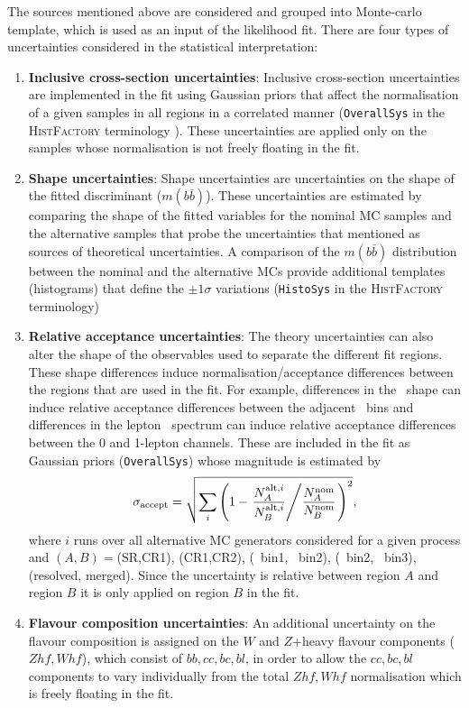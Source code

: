 \par The sources mentioned above are considered and grouped into Monte-carlo template, which is used as an input of the likelihood fit. There are four types of uncertainties considered in the statistical interpretation:

\begin{enumerate}
    \item \textbf{Inclusive cross-section uncertainties}: Inclusive cross-section uncertainties are implemented in the fit using Gaussian priors that affect the normalisation of a given samples in all regions in a correlated manner (\texttt{OverallSys} in the \textsc{HistFactory} terminology \cite{Cranmer:1456844}). These uncertainties are applied only on the samples whose normalisation is not freely floating in the fit.
    \item \textbf{Shape uncertainties}: Shape uncertainties are uncertainties on the shape of the fitted discriminant ($m(b\bar{b})$). These uncertainties are estimated by comparing the shape of the fitted variables for the nominal MC samples and the alternative samples that probe the uncertainties that mentioned as sources of theoretical uncertainties. A comparison of the $m(b\bar{b})$ distribution between the nominal and the alternative MCs provide additional templates (histograms) that define the $\pm1\sigma$ variations (\texttt{HistoSys} in the \textsc{HistFactory} terminology)
    \item \textbf{Relative acceptance uncertainties}: The theory uncertainties can also alter the shape of the observables used to separate the different fit regions. These shape differences induce normalisation/acceptance differences between the regions that are used in the fit. For example, differences in the \met~shape can induce relative acceptance differences between the adjacent \met~bins and differences in the lepton \pt~spectrum can induce relative acceptance differences between the 0 and 1-lepton channels. These are included in the fit as Gaussian priors (\texttt{OverallSys}) whose magnitude is estimated by
    \begin{equation}
    \sigma_{\text{accept}}=\sqrt{\sum_i \left( 1 - \left. \frac{N_A^{\text{alt},i}}{N_B^{\text{alt},i}} \middle/ \frac{N_A^{\text{nom}}}{N_B^{\text{nom}}} \right. \right)^2},
    \end{equation}
    where $i$ runs over all alternative MC generators considered for a given process and $(A,B)=$(SR,CR1), (CR1,CR2), (\met~bin1, \met~bin2), (\met~bin2, \met~bin3), (resolved, merged). Since the uncertainty is relative between region $A$ and region $B$ it is only applied on region $B$ in the fit.
    \item \textbf{Flavour composition uncertainties}: An additional uncertainty on the flavour composition is assigned on the $W$ and $Z$+heavy flavour components ($Zhf, Whf$), which consist of $bb,cc,bc,bl$, in order to allow the $cc,bc,bl$ components to vary individually from the total $Zhf, Whf$ normalisation which is freely floating in the fit.
\end{enumerate}

